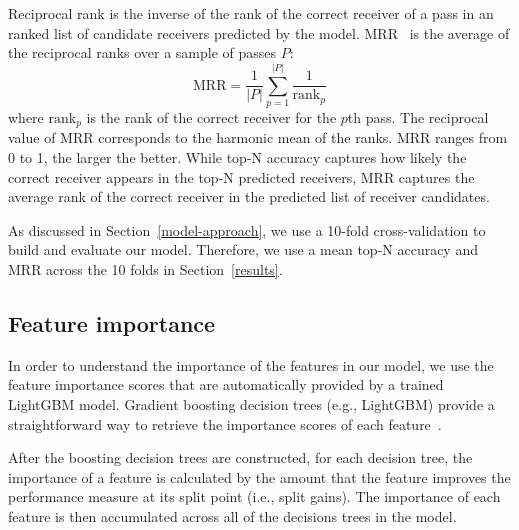 Reciprocal rank is the inverse of the rank of the correct receiver of a pass in an ranked list of candidate receivers predicted by the model.
MRR~\cite{Craswell2009} is the average of the reciprocal ranks over a sample of passes $P$:
\begin{equation}
  \textrm{MRR} = \frac{1}{|P|}\displaystyle\sum_{p=1}^{|P|}\frac{1}{\textrm{rank}_p}
\end{equation}
where $\textrm{rank}_p$ is the rank of the correct receiver for the $p$th pass.
The reciprocal value of MRR corresponds to the harmonic mean of the ranks.
MRR ranges from 0 to 1, the larger the better. 
While top-N accuracy captures how likely the correct receiver appears in the top-N predicted receivers, 
MRR captures the average rank of the correct receiver in the predicted list of receiver candidates.

As discussed in Section~\ref{model-approach}, we use a 10-fold cross-validation to build and evaluate our model. 
Therefore, we use a mean top-N accuracy and MRR across the 10 folds in Section~\ref{results}.
 

\subsection{Feature importance}

In order to understand the importance of the features in our model, we use the feature importance scores that are automatically provided by a trained LightGBM model.
Gradient boosting decision trees (e.g., LightGBM) provide a straightforward way to retrieve the importance scores of each feature~\cite{friedman2001elements}.

After the boosting decision trees are constructed, for each decision tree, the importance of a feature is calculated by the amount that the feature improves the performance measure at its split point (i.e., split gains). The importance of each feature is then accumulated across all of the decisions trees in the model.

